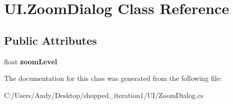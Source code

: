 \hypertarget{class_u_i_1_1_zoom_dialog}{
\section{UI.ZoomDialog Class Reference}
\label{class_u_i_1_1_zoom_dialog}
}
\subsection*{Public Attributes}
\begin{DoxyCompactItemize}
\item 
\hypertarget{class_u_i_1_1_zoom_dialog_aaf427f35a51b407dd48dd60c470ea011}{
float {\bfseries zoomLevel}}
\label{class_u_i_1_1_zoom_dialog_aaf427f35a51b407dd48dd60c470ea011}

\end{DoxyCompactItemize}


The documentation for this class was generated from the following file:\begin{DoxyCompactItemize}
\item 
C:/Users/Andy/Desktop/shopped\_\-iteration1/UI/ZoomDialog.cs\end{DoxyCompactItemize}
